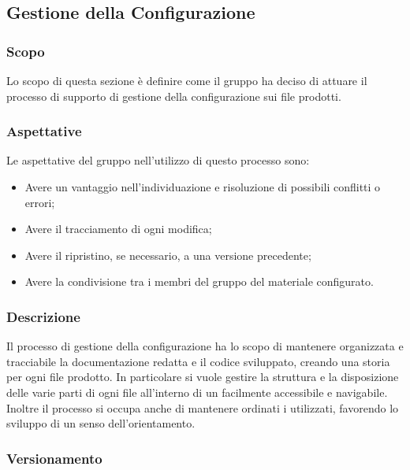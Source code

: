 \subsection{Gestione della Configurazione}
\subsubsection{Scopo}
Lo scopo di questa sezione è definire come il gruppo ha deciso di attuare il processo di supporto di gestione della configurazione sui file prodotti.

\subsubsection{Aspettative}
Le aspettative del gruppo \Gruppo{} nell'utilizzo di questo processo sono:
\begin{itemize}
	\item Avere un vantaggio nell'individuazione e risoluzione di possibili conflitti o errori;
	\item Avere il tracciamento di ogni modifica;
	\item Avere il ripristino, se necessario, a una versione precedente;
	\item Avere la condivisione tra i membri del gruppo del materiale configurato.
\end{itemize}

\subsubsection{Descrizione}
Il processo di gestione della configurazione ha lo scopo di mantenere organizzata e tracciabile la documentazione redatta e il codice sviluppato, creando una storia per ogni file prodotto. In particolare si vuole gestire la struttura e la disposizione delle varie parti di ogni file all'interno di un  facilmente accessibile e navigabile.
Inoltre il processo si occupa anche di mantenere ordinati i  utilizzati, favorendo lo sviluppo di un senso dell'orientamento.

\subsubsection{Versionamento}

